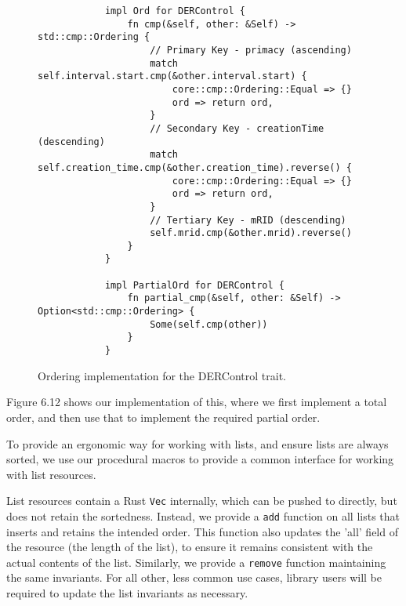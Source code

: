 \begin{figure}[H]
    \begin{center}
        \begin{lstlisting}
            impl Ord for DERControl {
                fn cmp(&self, other: &Self) -> std::cmp::Ordering {
                    // Primary Key - primacy (ascending)
                    match self.interval.start.cmp(&other.interval.start) {
                        core::cmp::Ordering::Equal => {}
                        ord => return ord,
                    }
                    // Secondary Key - creationTime (descending)
                    match self.creation_time.cmp(&other.creation_time).reverse() {
                        core::cmp::Ordering::Equal => {}
                        ord => return ord,
                    }
                    // Tertiary Key - mRID (descending)
                    self.mrid.cmp(&other.mrid).reverse()
                }
            } 

            impl PartialOrd for DERControl {
                fn partial_cmp(&self, other: &Self) -> Option<std::cmp::Ordering> {
                    Some(self.cmp(other))
                }
            }
        \end{lstlisting}
        \label{fig:dercord}
        \caption{Ordering implementation for the DERControl trait.}
    \end{center}
\end{figure}

Figure 6.12 shows our implementation of this, where we first implement a total order, and then use that to implement the required partial order.

To provide an ergonomic way for working with lists, and ensure lists are always sorted, we use our procedural macros to provide a common interface for working with list resources. 

List resources contain a Rust \texttt{Vec} internally, which can be pushed to directly, but does not retain the sortedness. Instead, we provide a \texttt{add} function on all lists that inserts and retains the intended order. This function also updates the 'all' field of the resource (the length of the list), to ensure it remains consistent with the actual contents of the list. Similarly, we provide a \texttt{remove} function maintaining the same invariants. For all other, less common use cases, library users will be required to update the list invariants as necessary. 

